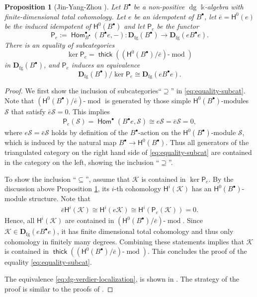 \documentclass[a4paper,11pt, reqno]{amsart}
\def\DD{\mathbf D}
\def\sK{\mathscr{K}}
\def\sS{\mathscr{S}}
\def\dg{{\operatorname{dg}}}
\def\mod{{\operatorname{mod}}}
\newcommand{\opname}[1]{\operatorname{\mathsf{#1}}}
\newcommand{\Hom}{\opname{Hom}}
\newcommand{\thick}{\opname{thick}\nolimits}
\newcommand{\bH}{\mathsf{H}}
\newcommand{\bP}{\mathsf{P}}
\theoremstyle{plain}
\newtheorem{proposition}[dummy]{Proposition}
\theoremstyle{definition}
\numberwithin{equation}{section}
\begin{document}
\begin{proposition}[Jin-Yang-Zhou \cite{dong-et-al}]\label{prop:dg-verdier}
    Let $B^\bullet$ be a non-positive $\dg$ $\mathbb k$-algebra with finite-dimensional total cohomology.
Let $e$ be an idempotent of $B^\bullet$, let $\bar{e} = \bH^0 (e)$ be the induced idempotent of $\bH^0 ( B^\bullet )$ and let $\bP_e$ be the functor 
\[
\bP_e:= \Hom_{B^\bullet}^\bullet ( B^\bullet e , -) \colon \DD_{\mathrm{fg}}( B^\bullet)\to \DD_{\mathrm{fg}}( e B^\bullet e ) .
\]
There is an equality of subcategories
\begin{equation}\label{eq:equality-subcat}
    \ker \bP_e = \thick (   (\bH^0( B^\bullet )/\bar{e})\mbox{-} \mod )
\end{equation}
in $\DD_{\mathrm{fg}} ( B^\bullet )$, and $\bP_e$
induces an equivalence 
\begin{equation}\label{eq:dg-verdier-localization}
    \DD_{\mathrm{fg}}( B^\bullet)  / \ker \bP_e \cong \DD_{\mathrm{fg}}( e B^\bullet e) .
\end{equation}
\end{proposition}

\begin{proof}
We first show the inclusion of subcategories``$ \supseteq$'' in \eqref{eq:equality-subcat}. 
Note that $(\bH^0( B^\bullet )/\bar{e})\mbox{-} \mod$ is generated by those simple  $\bH^0( B^\bullet )$-modules $\sS$ that satisfy $\bar{e} \sS  = 0$.
This implies 
\begin{align}
  \bP_e(\sS)=\Hom^\bullet( B^\bullet e , \sS ) \cong e \sS  = \bar{e}\sS= 0,  
\end{align}
where $e \sS  = \bar{e}\sS$ holds by definition of the $B^\bullet$-action on the $\bH^0( B^\bullet )$-module $\sS$, which is induced by the natural map $B^\bullet \to \bH^0( B^\bullet )$. Thus all generators of the triangulated category on the right hand side of \eqref{eq:equality-subcat} are contained in the category on the left, showing the inclusion ``$ \supseteq$''.    

To show the inclusion ``$\subseteq$'', assume that $\sK$ is contained in $\ker \bP_e$.
By the discussion above Proposition \ref{prop:dg-verdier}, its $i$-th cohomology $\bH^i ( \sK )$ has an $\bH^0 ( B^\bullet )$-module structure.
Note that 
\begin{align}
    \bar{e} \bH^i( \sK ) \cong \bH^i( e\sK ) \cong \bH^i(\bP_e ( \sK ))=0.
\end{align}
Hence, all $\bH^i ( \sK )$ are contained in $( \bH^0 ( B^\bullet ) / \bar{e}) \mbox{-} \mod $. Since $\sK \in \DD_{\mathrm{fg}} ( e B^\bullet e )$, it has finite dimensional total cohomology and thus only cohomology in finitely many degrees. Combining these statements implies that $\sK$ is contained in $\thick ( ( \bH^0 ( B^\bullet ) / \bar{e}) \mbox{-} \mod )$.
This concludes the proof of the equality \eqref{eq:equality-subcat}.

    The equivalence \eqref{eq:dg-verdier-localization}, is shown in \cite{dong-et-al}. 
    The strategy of the proof is similar to the proofs of \cite[Lemma 2.32 and Theorem 2.30]{pavic-shinder}.
\end{proof}
\end{document}
